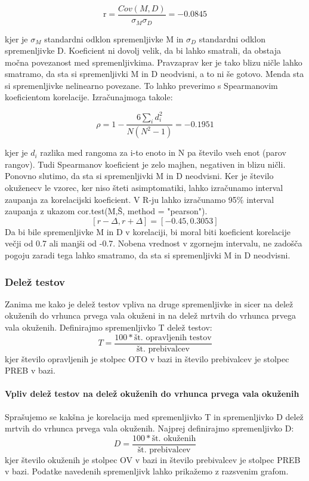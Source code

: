 \documentclass[a4paper,11pt]{article}
\begin{document}
\begin{center}
\[\text{r} = \frac{Cov(M,D)}{\sigma_{M} \sigma_{D}} = -0.0845\]
\end{center} 
kjer je \(\sigma_{M}\) standardni odklon spremenljivke M in \(\sigma_{D}\) standardni odklon spremenljivke D. Koeficient ni dovolj velik, da bi lahko smatrali, da obstaja močna povezanost med spremenljivkima. Pravzaprav ker je tako blizu ničle lahko smatramo, da sta si spremenljivki M in D neodvisni, a to ni še gotovo. Menda sta si spremenljivke nelinearno povezane. To lahko preverimo s Spearmanovim koeficientom korelacije. Izračunajmoga takole: 

\begin{center}
\[\rho = 1 - \frac{6\sum_{i}{}d_i^2}{N(N^2 - 1)} = -0.1951\]
\end{center} 

kjer je \( d_i \) razlika med rangoma za i-to enoto in N pa število vseh enot (parov rangov). Tudi Spearmanov koeficient je zelo majhen, negativen in blizu ničli. Ponovno slutimo, da sta si spremenljivki M in D neodvisni.
Ker je število okuženecv le vzorec, ker niso šteti asimptomatiki, lahko izračunamo interval zaupanja za korelacijski koeficient. V R-ju lahko izračunamo 95\% interval zaupanja z ukazom cor.test(M,Š, method = "pearson").
\[[r - \Delta, r + \Delta] = [-0.45, 0.3053]\]
Da bi bile spremenljivke M in D v korelaciji, bi moral biti koeficient korelacije večji od 0.7 ali manjši od -0.7. Nobena vrednost v zgornejm intervalu, ne zadošča pogoju zaradi tega lahko smatramo, da sta si spremenljivki M in D neodvisni.

\subsubsection{Delež testov}

Zanima me kako je delež testov vpliva na druge spremenljivke in sicer na delež okuženih do vrhunca prvega vala okuženi in na delež mrtvih do vrhunca prvega vala okuženih. Definirajmo spremenljivko T delež testov:
\[T = \frac{100 * \text{št. opravljenih testov}}{\text{št. prebivalcev}}\]
kjer število opravljenih je stolpec OTO v bazi in število prebivalcev je stolpec PREB v bazi.

\paragraph{Vpliv delež testov na delež okuženih do vrhunca prvega vala okuženih}
Sprašujemo se kakšna je korelacija med spremenljivko T in spremenljivko D delež mrtvih do vrhunca prvega vala okuženih. Najprej definirajmo spremenljivko D:
\[D = \frac{100 * \text{št. okuženih}}{\text{št. prebivalcev}}\]
kjer število okuženih je stolpec OV v bazi in število prebivalcev je stolpec PREB v bazi. Podatke navedenih spremenljivk lahko prikažemo z razsvenim grafom.
\end{document}
